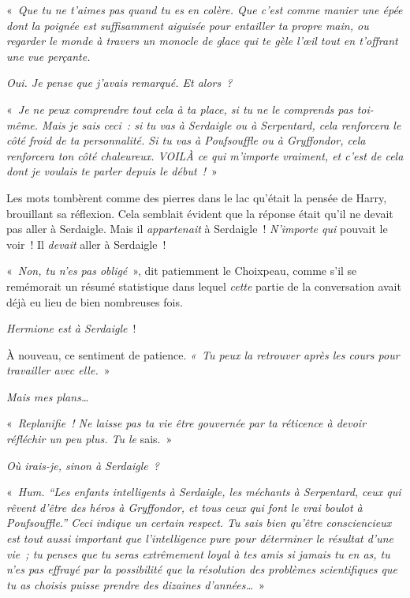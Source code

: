 «~\emph{Que tu ne t'aimes pas quand tu es en colère.
Que c'est comme manier une épée dont la poignée est suffisamment aiguisée pour entailler ta propre main, ou regarder le monde à travers un monocle de glace qui te gèle l'œil tout en t'offrant une vue perçante.}

\emph{Oui. Je pense que j'avais remarqué. Et alors~?}

«~\emph{Je ne peux comprendre tout cela à ta place, si tu ne le comprends pas toi-même.
Mais je sais ceci~: si tu vas à Serdaigle ou à Serpentard, cela renforcera le côté froid de ta personnalité.
Si tu vas à Poufsouffle ou à Gryffondor, cela renforcera ton côté chaleureux.
VOILÀ ce qui m'importe vraiment, et c'est de cela dont je voulais te parler depuis le début~!}~»

Les mots tombèrent comme des pierres dans le lac qu'était la pensée de Harry, brouillant sa réflexion.
Cela semblait évident que la réponse était qu'il ne devait pas aller à Serdaigle.
Mais il \emph{appartenait} à Serdaigle~!
\emph{N'importe qui} pouvait le voir~!
Il \emph{devait} aller à Serdaigle~!

«~\emph{Non, tu n'es pas obligé}~», dit patiemment le Choixpeau, comme s'il se remémorait un résumé statistique dans lequel \emph{cette} partie de la conversation avait déjà eu lieu de bien nombreuses fois.

\emph{Hermione est à Serdaigle}~!

À nouveau, ce sentiment de patience. \emph{«~Tu peux la retrouver après les cours pour travailler avec elle.}~»

\emph{Mais mes plans…}

«~\emph{Replanifie~! Ne laisse pas ta vie être gouvernée par ta réticence à devoir réfléchir un peu plus. Tu le} sais.~»

\emph{Où irais-je, sinon à Serdaigle~?}

«~\emph{Hum. “Les enfants intelligents à Serdaigle, les méchants à Serpentard, ceux qui rêvent d'être des héros à Gryffondor, et tous ceux qui font le vrai boulot à Poufsouffle.”
Ceci indique un certain respect.
Tu sais bien qu'être consciencieux est tout aussi important que l'intelligence pure pour déterminer le résultat d'une vie~;
tu penses que tu seras extrêmement loyal à tes amis si jamais tu en as, tu n'es pas effrayé par la possibilité que la résolution des problèmes scientifiques que tu as choisis puisse prendre des dizaines d'années…}~»

